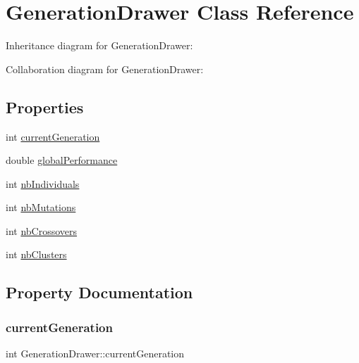 \hypertarget{class_generation_drawer}{}\section{Generation\+Drawer Class Reference}
\label{class_generation_drawer}


Inheritance diagram for Generation\+Drawer\+:


Collaboration diagram for Generation\+Drawer\+:
\subsection*{Properties}
\begin{DoxyCompactItemize}
\item 
int \hyperlink{class_generation_drawer_addfc36a0e697d85c8a2a378d31ab0d8a}{current\+Generation}
\item 
double \hyperlink{class_generation_drawer_a29c6e840b9baf5ab6d81d2d0e7ebad96}{global\+Performance}
\item 
int \hyperlink{class_generation_drawer_a16a03661e49be8af2816b60dd06d70be}{nb\+Individuals}
\item 
int \hyperlink{class_generation_drawer_a34ebc0a04244dd38adfc754d84cb2155}{nb\+Mutations}
\item 
int \hyperlink{class_generation_drawer_ab952aef839481b9e5c7403cd30a7b02a}{nb\+Crossovers}
\item 
int \hyperlink{class_generation_drawer_a93d3ef7769f775cdc79233e051a002cb}{nb\+Clusters}
\end{DoxyCompactItemize}


\subsection{Property Documentation}
\mbox{\label{class_generation_drawer_addfc36a0e697d85c8a2a378d31ab0d8a}} 
\subsubsection{\texorpdfstring{current\+Generation}{currentGeneration}}
{\footnotesize\ttfamily int Generation\+Drawer\+::current\+Generation}

\mbox{\label{class_generation_drawer_a29c6e840b9baf5ab6d81d2d0e7ebad96}} 
